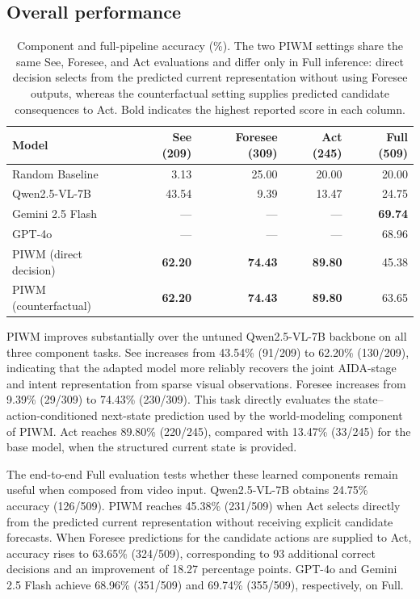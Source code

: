 \documentclass{article}
\begin{document}
\subsection{Overall performance}\label{overall-performance}

\begin{table}[tbp]
\centering\small
\setlength{\tabcolsep}{4pt}
\renewcommand{\arraystretch}{1.15}
\begin{tabularx}{\linewidth}{@{}Xrrrr@{}}
\toprule
Model & See (209) & Foresee (309) & Act (245) & Full (509) \\
\midrule
Random Baseline & 3.13 & 25.00 & 20.00 & 20.00 \\
Qwen2.5-VL-7B & 43.54 & 9.39 & 13.47 & 24.75 \\
Gemini 2.5 Flash & --- & --- & --- & \textbf{69.74} \\
GPT-4o & --- & --- & --- & 68.96 \\
PIWM (direct decision) &
\textbf{62.20} & \textbf{74.43} & \textbf{89.80} & 45.38 \\
PIWM (counterfactual) &
\textbf{62.20} & \textbf{74.43} & \textbf{89.80} & 63.65 \\
\bottomrule
\end{tabularx}
\caption{Component and full-pipeline accuracy (\%). The two PIWM
settings share the same See, Foresee, and Act evaluations and differ
only in Full inference: direct decision selects from the predicted
current representation without using Foresee outputs, whereas the
counterfactual setting supplies predicted candidate consequences to
Act. Bold indicates the highest reported score in each column.}
\label{tab:results-4}
\end{table}

PIWM improves substantially over the untuned Qwen2.5-VL-7B backbone on
all three component tasks. See increases from 43.54\% (91/209) to
62.20\% (130/209), indicating that the adapted model more reliably
recovers the joint AIDA-stage and intent representation from sparse
visual observations. Foresee increases from 9.39\% (29/309) to
74.43\% (230/309). This task directly evaluates the
state--action-conditioned next-state prediction used by the
world-modeling component of PIWM. Act reaches 89.80\% (220/245),
compared with 13.47\% (33/245) for the base model, when the structured
current state is provided.

The end-to-end Full evaluation tests whether these learned components
remain useful when composed from video input. Qwen2.5-VL-7B obtains
24.75\% accuracy (126/509). PIWM reaches 45.38\% (231/509) when Act
selects directly from the predicted current representation without
receiving explicit candidate forecasts. When Foresee predictions for
the candidate actions are supplied to Act, accuracy rises to 63.65\%
(324/509), corresponding to 93 additional correct decisions and an
improvement of 18.27 percentage points. GPT-4o and Gemini 2.5 Flash achieve 68.96\% (351/509) and 69.74\%
(355/509), respectively, on Full.
\end{document}

